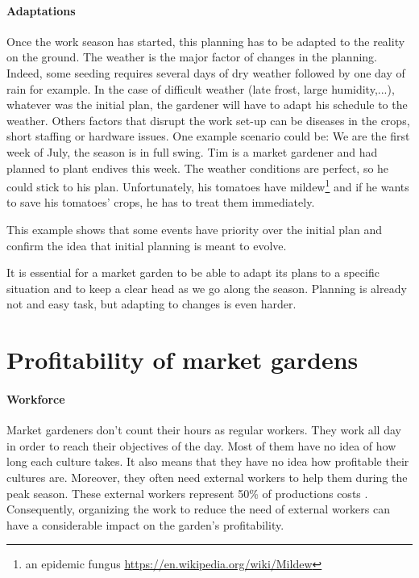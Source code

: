 \paragraph{Adaptations}
Once the work season has started, this planning has to be adapted to the reality on the ground.
The weather is the major factor of changes in the planning. Indeed, some seeding requires several days of dry weather followed by one day of rain for example. In the case of difficult weather (late frost, large humidity,...), whatever was the initial plan, the gardener will have to adapt his schedule to the weather.
Others factors that disrupt the work set-up can be diseases in the crops, short staffing or hardware issues.
One example scenario could be:
We are the first week of July, the season is in full swing. Tim is a market gardener and had planned to plant endives this week. The weather conditions are perfect, so he could stick to his plan. Unfortunately, his tomatoes have mildew\footnote{an epidemic fungus  \url{https://en.wikipedia.org/wiki/Mildew}} and if he wants to save his tomatoes' crops, he has to treat them immediately.

This example shows that some events have priority over the initial plan and confirm the idea that initial planning is meant to evolve.

It is essential for a market garden to be able to adapt its plans to a specific situation and to keep a clear head as we go along the season. Planning is already not and easy task, but adapting to changes is even harder. 



\section{Profitability of market gardens}


%
%
%


\paragraph{Workforce} Market gardeners don't count their hours as regular workers. They work all day in order to reach their objectives of the day. Most of them have no idea of how long each culture takes. It also means that they have no idea how profitable their cultures are. Moreover, they often need external workers to help them during the peak season. These external workers represent 50\% of productions costs \cite{fortier}. Consequently, organizing the work to reduce the need of external workers can have a considerable impact on the garden's profitability.

